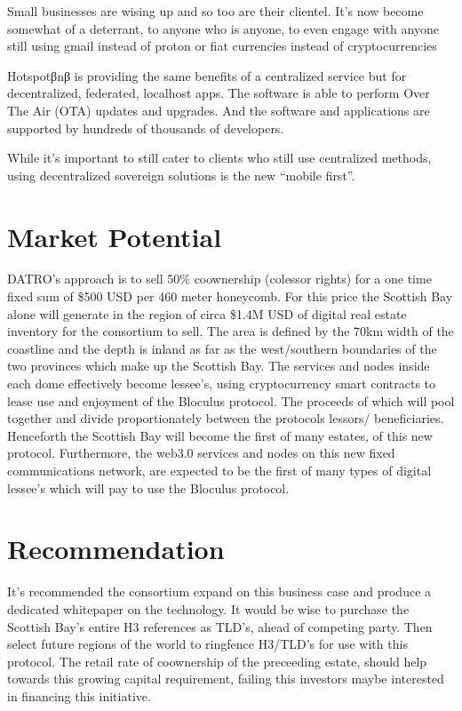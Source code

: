 \documentclass[letterpaper,10pt,openany,oneside,english]{sphinxmanual}
\begin{document}
\sphinxAtStartPar
Small businesses are wising up and so too are their clientel.
It’s now become somewhat of a deterrant, to anyone who is anyone, to even engage with anyone still using gmail instead of proton or fiat currencies instead of cryptocurrencies

\sphinxAtStartPar
Hotspotβnβ is providing the same benefits of a centralized service but for decentralized, federated, localhost apps.
The software is able to perform Over The Air (OTA) updates and upgrades.
And the software and applications are supported by hundreds of thousands of developers.

\sphinxAtStartPar
While it’s important to still cater to clients who still use centralized methods, using decentralized sovereign solutions is the new “mobile first”.


\section{Market Potential}
\label{\detokenize{executivesummary:market-potential}}
\sphinxAtStartPar
DATRO’s approach is to sell 50\% co\sphinxhyphen{}ownership (co\sphinxhyphen{}lessor rights) for a one time fixed sum of \$500 USD per 460 meter honeycomb.
For this price the Scottish Bay alone will generate in the region of circa \$1.4M USD of digital real estate inventory for the consortium to sell.
The area is defined by the 70km width of the coastline and the depth is inland as far as the west/southern boundaries of the two provinces which make up the Scottish Bay.
The services and nodes inside each dome effectively become lessee’s, using cryptocurrency smart contracts to lease use and enjoyment of the Bloculus protocol.
The proceeds of which will pool together and divide proportionately between the protocols lessors/ beneficiaries.
Henceforth the Scottish Bay will become the first of many estates, of this new protocol.
Furthermore, the web3.0 services and nodes on this new fixed communications network, are expected to be the first of many types of digital lessee’s which will pay to use the Bloculus protocol.


\section{Recommendation}
\label{\detokenize{executivesummary:recommendation}}
\sphinxAtStartPar
It’s recommended the consortium expand on this business case and produce a dedicated whitepaper on the technology.
It would be wise to purchase the Scottish Bay’s entire H3 references as TLD’s, ahead of competing party.
Then select future regions of the world to ringfence H3/TLD’s for use with this protocol.
The retail rate of co\sphinxhyphen{}ownership of the preceeding estate, should help towards this growing capital requirement, failing this investors maybe interested in financing this initiative.
\end{document}
